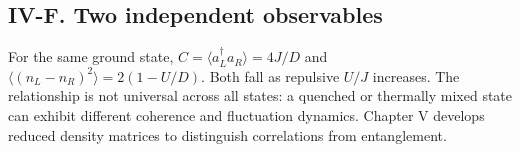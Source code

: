 \documentclass[11pt,a4paper]{article}
\begin{document}
\subsection*{IV-F. Two independent observables}
For the same ground state, $C=\langle a_L^\dagger a_R\rangle=4J/D$ and $\langle(n_L-n_R)^2\rangle=2(1-U/D)$. Both fall as repulsive $U/J$ increases. The relationship is not universal across all states: a quenched or thermally mixed state can exhibit different coherence and fluctuation dynamics. Chapter V develops reduced density matrices to distinguish correlations from entanglement.
\end{document}
